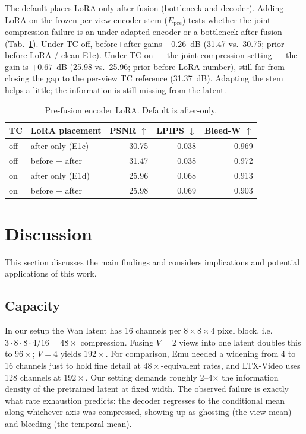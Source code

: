 The default places LoRA only after fusion (bottleneck and decoder). Adding LoRA on the frozen per-view encoder stem ($E_{\mathrm{pre}}$) tests whether the joint-compression failure is an under-adapted encoder or a bottleneck after fusion (Tab.~\ref{tab:lora_before}). Under TC off, before+after gains ${+}0.26$~dB (31.47 vs.\ 30.75; prior before-LoRA / clean E1c). Under TC on --- the joint-compression setting --- the gain is ${+}0.67$~dB (25.98 vs.\ 25.96; prior before-LoRA number), still far from closing the gap to the per-view TC reference (31.37~dB). Adapting the stem helps a little; the information is still missing from the latent.

\begin{table}[t]
\centering
\caption{Pre-fusion encoder LoRA. Default is after-only.}
\label{tab:lora_before}
\begin{tabular}{llrrr}
\toprule
TC & LoRA placement & PSNR $\uparrow$ & LPIPS $\downarrow$ & Bleed-W $\uparrow$ \\
\midrule
off & after only (E1c)     & 30.75 & 0.038 & 0.969 \\
off & before + after       & 31.47 & 0.038 & 0.972 \\
\midrule
on  & after only (E1d)     & 25.96 & 0.068 & 0.913 \\
on  & before + after       & 25.98 & 0.069 & 0.903 \\
\bottomrule
\end{tabular}
\end{table}











\section{Discussion}

This section discusses the main findings and considers implications and potential applications of this work.

\subsection{Capacity}

In our setup the Wan latent has 16 channels per $8{\times}8{\times}4$ pixel block, i.e.\ $3{\cdot}8{\cdot}8{\cdot}4/16 = 48\times$ compression. Fusing $V{=}2$ views into one latent doubles this to $96\times$; $V{=}4$ yields $192\times$. For comparison, Emu \cite{dai2023emu} needed a widening from 4 to 16 channels just to hold fine detail at $48\times$-equivalent rates, and LTX-Video \cite{hacohen2024ltx} uses 128 channels at $192\times$. Our setting demands roughly 2--4$\times$ the information density of the pretrained latent at fixed width. The observed failure is exactly what rate exhaustion predicts: the decoder regresses to the conditional mean along whichever axis was compressed, showing up as ghosting (the view mean) and bleeding (the temporal mean).

